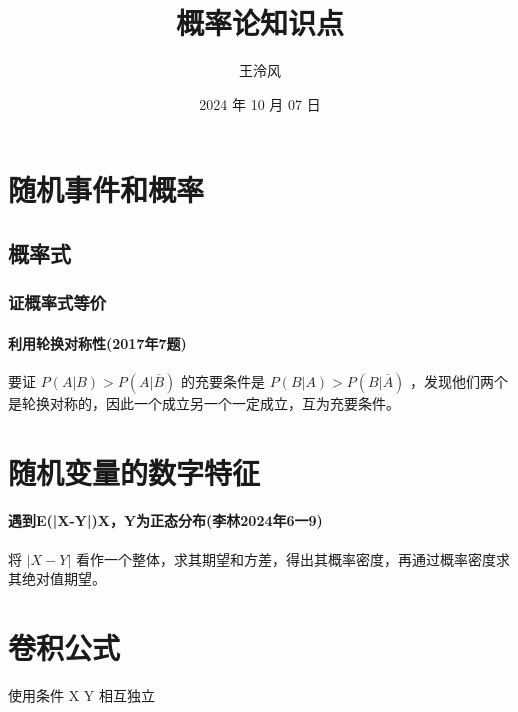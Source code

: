 \documentclass[a4paper,12pt,UTF8]{ctexart}
\begin{document}
    \title{概率论知识点}
    \author{王泠风}
    \date{2024 年 10 月 07 日}
    \maketitle

    \section{随机事件和概率}

    \subsection{概率式}

    \subsubsection{证概率式等价}

    \paragraph{利用轮换对称性(2017年7题)}
    要证 \(P(A|B)>P(A|\overline{B})\) 的充要条件是 \(P(B|A)>P(B|\overline{A})\) ，发现他们两个是轮换对称的，因此一个成立另一个一定成立，互为充要条件。

    \section{随机变量的数字特征}

    \paragraph{遇到E(|X-Y|)X，Y为正态分布(李林2024年6一9)} 将 \(\left| X-Y \right| \) 看作一个整体，求其期望和方差，得出其概率密度，再通过概率密度求其绝对值期望。

    \section{卷积公式}
    使用条件 X Y 相互独立
\end{document}
